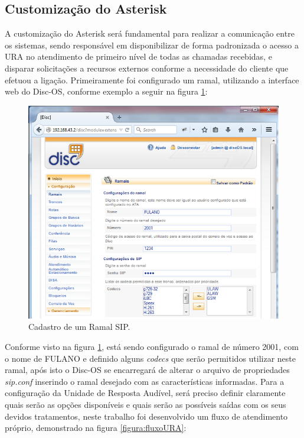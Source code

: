\subsection{Customização do Asterisk}

A customização do Asterisk será fundamental para realizar a comunicação entre os sistemas, sendo responsável em disponibilizar de forma padronizada o acesso a URA no atendimento de primeiro nível de todas as chamadas recebidas, e disparar solicitações a recursos externos conforme a necessidade do cliente que efetuou a ligação.
Primeiramente foi configurado um ramal, utilizando a interface web do Disc-OS, conforme exemplo a seguir na figura \ref{figura:cadastroRamapSIP}:


\begin{figure}[H]
	\centering
	\caption{Cadastro de um Ramal SIP.}	
	\label{figura:cadastroRamapSIP}
	\includegraphics{figuras/cadastro_ramal_sip.png}
\end{figure}


Conforme visto na figura \ref{figura:cadastroRamapSIP}, está sendo configurado o ramal de número 2001, com o nome de FULANO e definido alguns \textit{codecs} que serão permitidos utilizar neste ramal, após isto o Disc-OS se encarregará de alterar o arquivo de propriedades \textit{sip.conf} inserindo o ramal desejado com as características informadas.
Para a configuração da Unidade de Resposta Audível, será preciso definir claramente quais serão as opções disponíveis e quais serão as possíveis saídas com os seus devidos tratamentos, neste trabalho foi desenvolvido um fluxo de atendimento próprio, demonstrado na figura \ref{figura:fluxoURA}: 

